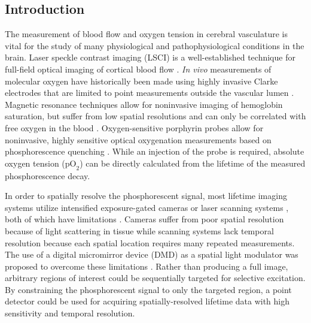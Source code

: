 \documentclass[12pt]{spieman}  %
\newcommand{\pO}{\ensuremath{\text{pO}_2}}
\begin{document}
\begin{spacing}{2}   %


\section{Introduction}
\label{sect:introduction}

The measurement of blood flow and oxygen tension in cerebral vasculature is vital for the study of many physiological and pathophysiological conditions in the brain. Laser speckle contrast imaging (LSCI) is a well-established technique for full-field optical imaging of cortical blood flow \cite{Briers:2001hy,Dunn:2001dj,Boas:2010vr,Dunn:2011gi}. \textit{In vivo} measurements of molecular oxygen have historically been made using highly invasive Clarke electrodes that are limited to point measurements outside the vascular lumen \cite{Vovenko:1999be,Tsai:2003cc,Roussakis:2015eu}. Magnetic resonance techniques allow for noninvasive imaging of hemoglobin saturation, but suffer from low spatial resolutions and can only be correlated with free oxygen in the blood \cite{Dunn:2003hg,Liu:2004fp,Hou:2003hb,Liu:2006bt,Roussakis:2015eu}. Oxygen-sensitive porphyrin probes allow for noninvasive, highly sensitive optical oxygenation measurements based on phosphorescence quenching \cite{Vinogradov:2012tda}. While an injection of the probe is required, absolute oxygen tension (\pO) can be directly calculated from the lifetime of the measured phosphorescence decay.

In order to spatially resolve the phosphorescent signal, most lifetime imaging systems utilize intensified exposure-gated cameras \cite{Shonat:2003ia,Sakadzic:2009jo} or laser scanning systems \cite{Yaseen:2009ep,Kazmi:2013ey}, both of which have limitations \cite{Devor:2014ke}. Cameras suffer from poor spatial resolution because of light scattering in tissue while scanning systems lack temporal resolution because each spatial location requires many repeated measurements. The use of a digital micromirror device (DMD) as a spatial light modulator was proposed to overcome these limitations \cite{Ponticorvo:2010uv}. Rather than producing a full image, arbitrary regions of interest could be sequentially targeted for selective excitation. By constraining the phosphorescent signal to only the targeted region, a point detector could be used for acquiring spatially-resolved lifetime data with high sensitivity and temporal resolution.


\end{spacing}
\end{document}
